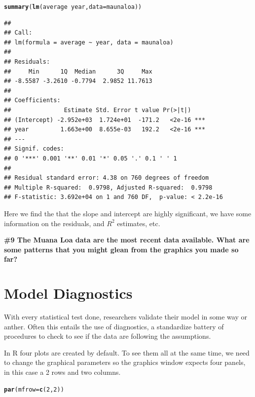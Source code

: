 \documentclass{tufte-handout}\usepackage[]{graphicx}\usepackage[]{xcolor}
\makeatletter
\newcommand{\hlnum}[1]{\textcolor[rgb]{0.686,0.059,0.569}{#1}}%
\newcommand{\hlopt}[1]{\textcolor[rgb]{0,0,0}{#1}}%
\newcommand{\hlstd}[1]{\textcolor[rgb]{0.345,0.345,0.345}{#1}}%
\newcommand{\hlkwc}[1]{\textcolor[rgb]{0.333,0.667,0.333}{#1}}%
\newcommand{\hlkwd}[1]{\textcolor[rgb]{0.737,0.353,0.396}{\textbf{#1}}}%
\newenvironment{kframe}{%
 \def\at@end@of@kframe{}%
 \ifinner\ifhmode%
  \def\at@end@of@kframe{\end{minipage}}%
  \begin{minipage}{\columnwidth}%
 \fi\fi%
 \def\FrameCommand##1{\hskip\@totalleftmargin \hskip-\fboxsep
 \colorbox{shadecolor}{##1}\hskip-\fboxsep
     \hskip-\linewidth \hskip-\@totalleftmargin \hskip\columnwidth}%
 \MakeFramed {\advance\hsize-\width
   \@totalleftmargin\z@ \linewidth\hsize
   \@setminipage}}%
 {\par\unskip\endMakeFramed%
 \at@end@of@kframe}
\newenvironment{knitrout}{}{} %
\makeatother
\begin{document}
\begin{knitrout}
\color{fgcolor}\begin{kframe}
\begin{alltt}
\hlkwd{summary}\hlstd{(}\hlkwd{lm}\hlstd{(average} \hlopt{~} \hlstd{year,} \hlkwc{data}\hlstd{=maunaloa))}
\end{alltt}
\begin{verbatim}
## 
## Call:
## lm(formula = average ~ year, data = maunaloa)
## 
## Residuals:
##     Min      1Q  Median      3Q     Max 
## -8.5587 -3.2610 -0.7794  2.9852 11.7613 
## 
## Coefficients:
##               Estimate Std. Error t value Pr(>|t|)    
## (Intercept) -2.952e+03  1.724e+01  -171.2   <2e-16 ***
## year         1.663e+00  8.655e-03   192.2   <2e-16 ***
## ---
## Signif. codes:  
## 0 '***' 0.001 '**' 0.01 '*' 0.05 '.' 0.1 ' ' 1
## 
## Residual standard error: 4.38 on 760 degrees of freedom
## Multiple R-squared:  0.9798,	Adjusted R-squared:  0.9798 
## F-statistic: 3.692e+04 on 1 and 760 DF,  p-value: < 2.2e-16
\end{verbatim}
\end{kframe}
\end{knitrout}

Here we find the that the slope and intercept are highly significant, we have some information on the residuals, and $R^2$ estimates, etc.

\bigskip
\noindent  \textbf{\#9 The Muana Loa data are the most recent data available. What are some patterns that you might glean from the graphics you made so far? }

\section{Model Diagnostics}

With every statistical test done, researchers validate their model in some way or anther. Often this entails the use of diagnostics, a standardize battery of procedures to check to see if the data are following the assumptions. 

In R four plots are created by default.  To see them all at the same time, we need to change the graphical parameters so the graphics window expects four panels, in this case a 2 rows and two columns. 

\begin{knitrout}
\color{fgcolor}\begin{kframe}
\begin{alltt}
\hlkwd{par}\hlstd{(}\hlkwc{mfrow}\hlstd{=}\hlkwd{c}\hlstd{(}\hlnum{2}\hlstd{,}\hlnum{2}\hlstd{))}
\end{alltt}
\end{kframe}
\end{knitrout}
\end{document}
